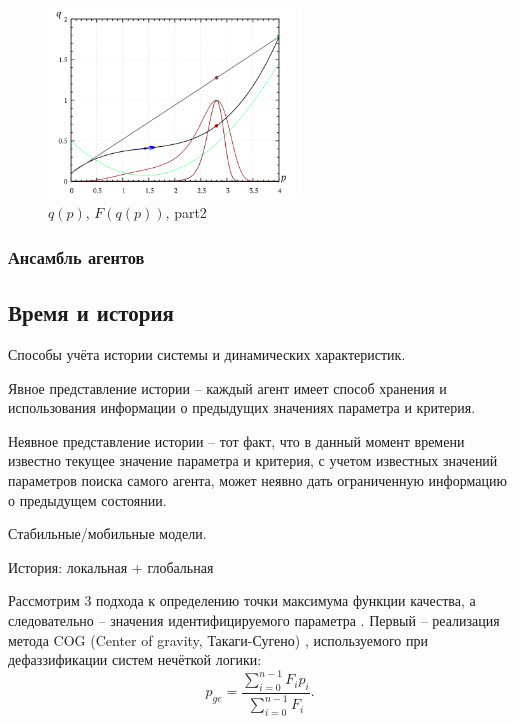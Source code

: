 \begin{figure}[htb!]
  \centerline{\includegraphics[width=0.6\textwidth]{pq_2x8.png} }
  \caption{$q(p)$, $F(q(p))$, part2 }
  \label{atu:pq_2x8}
\end{figure}

\subsubsection{Ансамбль агентов}


\subsection{Время и история}

Способы учёта истории системы и динамических характеристик.

Явное представление истории -- каждый агент имеет способ хранения и использования
информации о предыдущих значениях параметра и критерия.

Неявное представление истории -- тот факт, что в данный момент времени известно
текущее значение параметра и критерия, с учетом известных значений
параметров поиска самого агента, может неявно дать ограниченную информацию
о предыдущем состоянии.

Стабильные/мобильные модели.

История: локальная + глобальная




Рассмотрим 3 подхода к определению
точки максимума функции качества, а следовательно -- значения идентифицируемого параметра \cite{atu_st99,atu_jacs2015}.
Первый -- реализация
метода COG (Center of gravity, Такаги-Сугено) \cite{atu_asau25,atu_csit2015},
используемого при дефаззификации систем нечёткой логики:
%
\begin{equation}
  p_{ge}
  =
  \frac{\sum\limits_{i=0}^{n-1} F_{i} p_{i}}
       {\sum\limits_{i=0}^{n-1} F_{i} }
  .
  \label{atu:eq:p_ge}
\end{equation}

